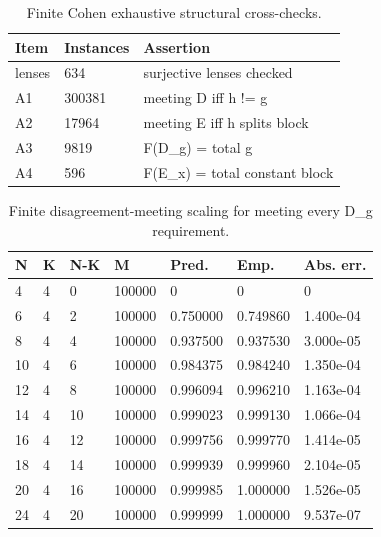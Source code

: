 \begin{table}[t]
\centering
\small
\caption{Finite Cohen exhaustive structural cross-checks.}
\label{tab:finite-cohen-exhaustive}
\begin{tabular}{@{}lll@{}}
\toprule
Item & Instances & Assertion \\
\midrule
lenses & 634 & surjective lenses checked \\
A1 & 300381 & meeting D iff h != g \\
A2 & 17964 & meeting E iff h splits block \\
A3 & 9819 & F(D\_g) = total g \\
A4 & 596 & F(E\_x) = total constant block \\
\bottomrule
\end{tabular}
\end{table}
\begin{table}[t]
\centering
\small
\caption{Finite disagreement-meeting scaling for meeting every D\_g requirement.}
\label{tab:finite-cohen-scaling}
\begin{tabular}{@{}lllllll@{}}
\toprule
N & K & N-K & M & Pred. & Emp. & Abs. err. \\
\midrule
4 & 4 & 0 & 100000 & 0 & 0 & 0 \\
6 & 4 & 2 & 100000 & 0.750000 & 0.749860 & 1.400e-04 \\
8 & 4 & 4 & 100000 & 0.937500 & 0.937530 & 3.000e-05 \\
10 & 4 & 6 & 100000 & 0.984375 & 0.984240 & 1.350e-04 \\
12 & 4 & 8 & 100000 & 0.996094 & 0.996210 & 1.163e-04 \\
14 & 4 & 10 & 100000 & 0.999023 & 0.999130 & 1.066e-04 \\
16 & 4 & 12 & 100000 & 0.999756 & 0.999770 & 1.414e-05 \\
18 & 4 & 14 & 100000 & 0.999939 & 0.999960 & 2.104e-05 \\
20 & 4 & 16 & 100000 & 0.999985 & 1.000000 & 1.526e-05 \\
24 & 4 & 20 & 100000 & 0.999999 & 1.000000 & 9.537e-07 \\
\bottomrule
\end{tabular}
\end{table}
